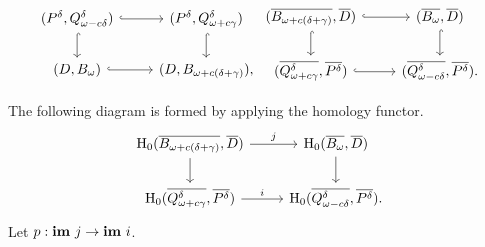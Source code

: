 \[ \begin{tikzcd}
  (\P, \Q^\of) \arrow[hookrightarrow]{r}\arrow[hookrightarrow]{d} &
  (\P, \QQ^\of) \arrow[hookrightarrow]{d} \\
  (D, \bb) \arrow[hookrightarrow]{r} &
  (D, \BB),
\end{tikzcd}\begin{tikzcd}
  (\cmp{\BB},\cmp{D})\arrow[hookrightarrow]{d}\arrow[hookrightarrow]{r} & %
  (\cmp{\bb}, \cmp{D}) \arrow[hookrightarrow]{d}\\
  (\cmp{\QQ^\of}, \cmp{\P}) \arrow[hookrightarrow]{r} & %
  (\cmp{\Q^\of}, \cmp{\P}).
\end{tikzcd}\]

The following diagram is formed by applying the homology functor.
\begin{equation}\label{dgm:1}\begin{tikzcd}
  \hom_0(\cmp{\BB},\cmp{D})\arrow{d} \arrow{r}{j} & %
  \hom_0(\cmp{\bb}, \cmp{D}) \arrow{d} \\
  \hom_0(\cmp{\QQ^\of}, \cmp{\P}) \arrow{r}{i} & %
  \hom_0(\cmp{\Q^\of}, \cmp{\P}).
\end{tikzcd}\end{equation}
Let $p : \mathbf{im}~j\to\mathbf{im}~i$.

